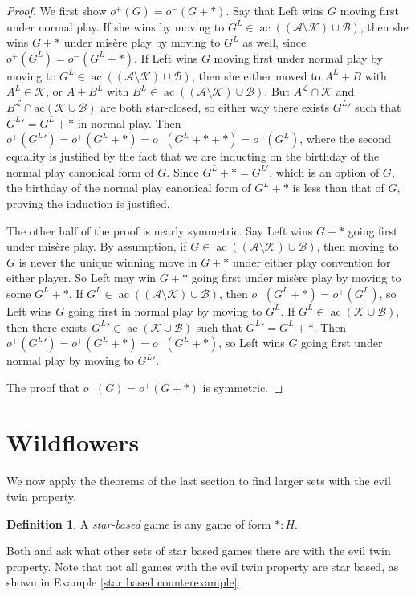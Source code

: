 \documentclass{amsart}
\theoremstyle{plain}
\theoremstyle{definition}
\newtheorem{defn}[thm]{Definition}
\theoremstyle{remark}
\numberwithin{equation}{section}
\numberwithin{thm}{section}
\DeclareMathOperator{\ac}{ac}
\begin{document}
\begin{proof}
    We first show $o^+(G) = o^-(G+*)$. Say that Left wins $G$ moving first under normal play. If she wins by moving to $G^L \in \ac( (\mathscr{A}\setminus \mathscr{K} )\cup \mathscr{B})$, then she wins $G+*$ under mis\`ere play by moving to $G^L$ as well, since $o^+(G^L) = o^-(G^L+*)$. If Left wins $G$ moving first under normal play by moving to $G^L \in \ac( (\mathscr{A}\setminus \mathscr{K} )\cup \mathscr{B})$, then she either moved to $A^L + B$ with $A^L \in \mathscr{K}$, or $A+B^L$ with $B^L \in \ac( (\mathscr{A}\setminus \mathscr{K} )\cup \mathscr{B})$. But $A^{\mathcal{L}} \cap  \mathscr{K}$ and $B^{\mathcal{L}}  \cap \text{ac}(\mathscr{K} \cup \mathscr{B})$ are both star-closed, so either way there exists ${G^L}'$ such that ${G^L}' = G^L+*$ in normal play. Then $o^+({G^L}') = o^+(G^L+*) = o^-(G^L+*+*) = o^-(G^L)$, where the second equality is justified by the fact that we are inducting on the birthday of the normal play canonical form of $G$. Since $G^L+* = G^{L'}$, which is an option of $G$, the birthday of the normal play canonical form of $G^L +*$ is less than that of $G$, proving the induction is justified.

The other half of the proof is nearly symmetric. Say Left wins $G+*$ going first under mis\`ere play. By assumption, if $G \in \ac((\mathscr{A}\setminus\mathscr{K} )\cup 
\mathscr{B})$, then moving to $G$ is never the unique winning move in $G+*$ under either play convention for either player. So Left may win $G+*$ going first under mis\`ere play by moving to some $G^L+*$. If $G^L \in \ac( (\mathscr{A}\setminus \mathscr{K} )\cup \mathscr{B})$, then $o^-(G^L+*) =o^+(G^L)$, so Left wins $G$ going first in normal play by moving to $G^L$. If $G^L \in \ac(  \mathscr{K} \cup \mathscr{B})$, then there exists ${G^L}' \in\ac(  \mathscr{K} \cup \mathscr{B})$ such that ${G^L}' = G^L+*$. Then $o^+({G^L}') =o^+(G^L+*) = o^-(G^L+*)$, so Left wins $G$ going first under normal play by moving to ${G^L}'$.

The proof that $o^-(G) = o^+(G+*)$ is symmetric.
\end{proof}
\section{Wildflowers}
\label{wildflowers}
We now apply the theorems of the last section to find larger sets with the evil twin property.
\begin{defn}
A \emph{star-based} game is any game of form $*:H$.
\end{defn}
Both \cite{mckay2016misere} and \cite{lomisere} ask what other sets of star based games there are with the evil twin property. Note that not all games with the evil twin property are star based, as shown in Example \ref{star based counterexample}.
\end{document}
